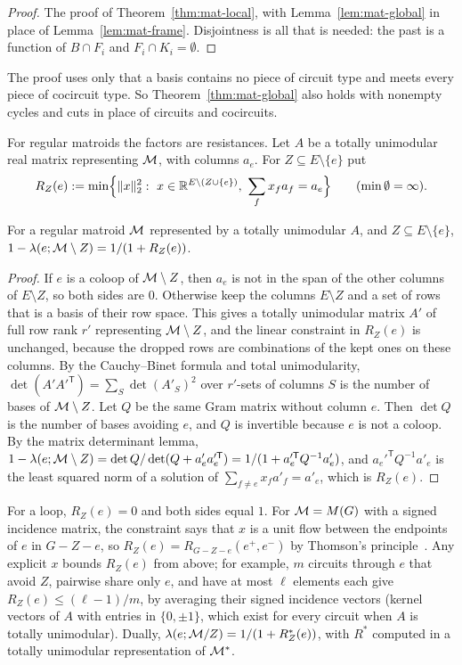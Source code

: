 \begin{proof}
The proof of Theorem~\ref{thm:mat-local}, with Lemma~\ref{lem:mat-global} in place of Lemma~\ref{lem:mat-frame}. Disjointness is all that is needed: the past is a function of $B\cap F_i$ and $F_i\cap K_i=\emptyset$.
\end{proof}

The proof uses only that a basis contains no piece of circuit type and meets every piece of cocircuit type. So Theorem~\ref{thm:mat-global} also holds with nonempty cycles and cuts in place of circuits and cocircuits.

For regular matroids the factors are resistances. Let $A$ be a totally unimodular real matrix representing $\mathcal{M}$, with columns $a_e$. For $Z\subseteq E\setminus\{e\}$ put
\[
  R_Z(e):=\min\Bigl\{\norm x_2^2:\ x\in\R^{E\setminus(Z\cup\{e\})},\ \sum_fx_fa_f=a_e\Bigr\}\qquad(\min\emptyset=\infty).
\]

\begin{lemma}\label{lem:mat-resist}
For a regular matroid $\mathcal{M}$ represented by a totally unimodular $A$, and $Z\subseteq E\setminus\{e\}$, $1-\lambda(e;\mathcal{M}\setminus Z)=1/(1+R_Z(e))$.
\end{lemma}

\begin{proof}
If $e$ is a coloop of $\mathcal{M}\setminus Z$, then $a_e$ is not in the span of the other columns of $E\setminus Z$, so both sides are $0$. Otherwise keep the columns $E\setminus Z$ and a set of rows that is a basis of their row space. This gives a totally unimodular matrix $A'$ of full row rank $r'$ representing $\mathcal{M}\setminus Z$, and the linear constraint in $R_Z(e)$ is unchanged, because the dropped rows are combinations of the kept ones on these columns. By the Cauchy--Binet formula and total unimodularity, $\det(A'A'^{\mathsf T})=\sum_S\det(A'_S)^2$ over $r'$-sets of columns $S$ is the number of bases of $\mathcal{M}\setminus Z$. Let $Q$ be the same Gram matrix without column $e$. Then $\det Q$ is the number of bases avoiding $e$, and $Q$ is invertible because $e$ is not a coloop. By the matrix determinant lemma, $1-\lambda(e;\mathcal{M}\setminus Z)=\det Q/\det(Q+a'_ea_e'^{\mathsf T})=1/(1+a_e'^{\mathsf T}Q^{-1}a'_e)$, and $a_e'^{\mathsf T}Q^{-1}a'_e$ is the least squared norm of a solution of $\sum_{f\ne e}x_fa'_f=a'_e$, which is $R_Z(e)$.
\end{proof}

For a loop, $R_Z(e)=0$ and both sides equal $1$. For $\mathcal{M}=M(G)$ with a signed incidence matrix, the constraint says that $x$ is a unit flow between the endpoints of $e$ in $G-Z-e$, so $R_Z(e)=R_{G-Z-e}(e^+,e^-)$ by Thomson's principle~\cite{LyonsPeres16}. Any explicit $x$ bounds $R_Z(e)$ from above; for example, $m$ circuits through $e$ that avoid $Z$, pairwise share only $e$, and have at most $\ell$ elements each give $R_Z(e)\le(\ell-1)/m$, by averaging their signed incidence vectors (kernel vectors of $A$ with entries in $\{0,\pm1\}$, which exist for every circuit when $A$ is totally unimodular). Dually, $\lambda(e;\mathcal{M}/Z)=1/(1+R^*_Z(e))$, with $R^*$ computed in a totally unimodular representation of $\mathcal{M}^*$.

